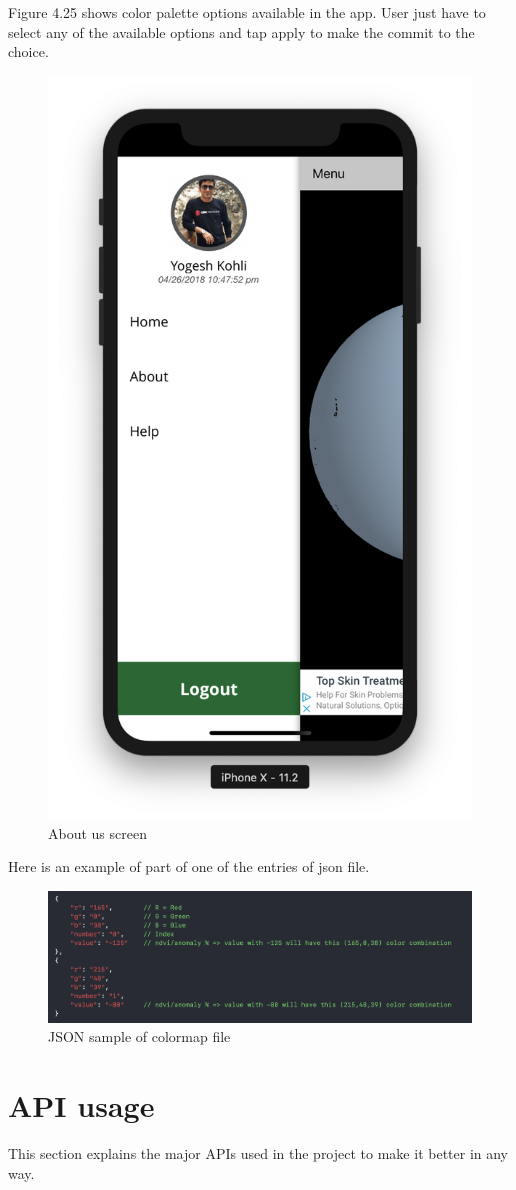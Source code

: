 \begin{itemize}
    Figure 4.25 shows color palette options available in the app. User just have to select any of the available options and tap apply to make the commit to the choice.
    
     \begin{figure}[H]
            \centering
            \includegraphics[width=0.35\linewidth]{figures/ch2/side_menu.png}
            \caption{\label{fig:pass_recovery_1} About us screen}
    \end{figure}
        
    Here is an example of part of one of the entries of \gls{json} file.
    
    \begin{figure}[H]
            \centering
            \includegraphics[width=1.0\linewidth]{figures/ch4/color_map_final.png}
            \caption{\label{fig:color_json} JSON sample of colormap file}
    \end{figure}

    \newpage
    
\end{itemize}

\section{API usage}

This section explains the major APIs used in the project to make it better in any way.

